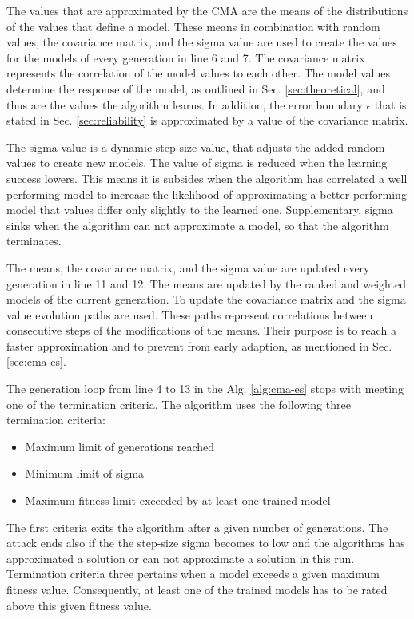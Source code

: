 The values that are approximated by the \ac{CMA} are the means of the distributions of the values that define a model.
These means in combination with random values, the covariance matrix, and the sigma value are used to create the values for the models of every generation in line 6 and 7. %
The covariance matrix represents the correlation of the model values to each other.
The model values determine the response of the \apuf model, as outlined in Sec. \ref{sec:theoretical}, and thus are the values the algorithm learns.
In addition, the error boundary $\epsilon$ that is stated in Sec. \ref{sec:reliability} is approximated by a value of the covariance matrix.

The sigma value is a dynamic step-size value, that adjusts the added random values to create new models.
The value of sigma is reduced when the learning success lowers.
This means it is subsides when the algorithm has correlated a well performing model to increase the likelihood of approximating a better performing model that values differ only slightly to the learned one. %
Supplementary, sigma sinks when the algorithm can not approximate a model, so that the algorithm terminates.

The means, the covariance matrix, and the sigma value are updated every generation in line 11 and 12.
The means are updated by the ranked and weighted models of the current generation. %
To update the covariance matrix and the sigma value evolution paths are used.
These paths represent correlations between consecutive steps of the modifications of the means. 
Their purpose is to reach a faster approximation and to prevent from early adaption, as mentioned in Sec. \ref{sec:cma-es}.

The generation loop from line 4 to 13 in the Alg. \ref{alg:cma-es} stops with meeting one of the termination criteria.
The algorithm uses the following three termination criteria:

\begin{itemize}
\item Maximum limit of generations reached
\item Minimum limit of sigma
\item Maximum fitness limit exceeded by at least one trained model
\end{itemize}

The first criteria exits the algorithm after a given number of generations.
The attack ends also if the the step-size sigma becomes to low and the algorithms has approximated a solution or can not approximate a solution in this run. %
Termination criteria three pertains when a model exceeds a given maximum fitness value.
Consequently, at least one of the trained models has to be rated above this given fitness value.

